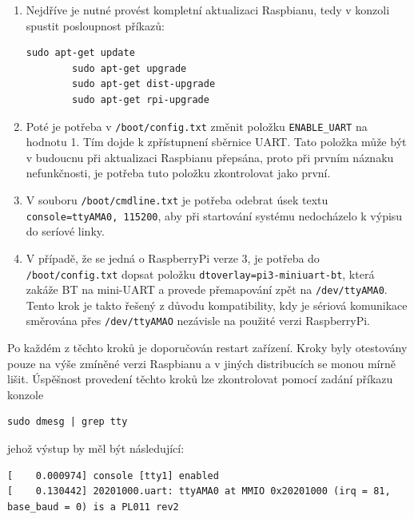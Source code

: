 \begin{enumerate}
	\item Nejdříve je nutné provést kompletní aktualizaci Raspbianu, tedy v konzoli spustit posloupnost příkazů:
	
	\begin{lstlisting}[style=MyCodeBash]
		sudo apt-get update
		sudo apt-get upgrade
		sudo apt-get dist-upgrade
		sudo apt-get rpi-upgrade	
	\end{lstlisting}
					
	\item Poté je potřeba v \texttt{/boot/config.txt} změnit položku \texttt{ENABLE\_UART} na hodnotu 1. Tím dojde k zpřístupnení sběrnice UART. Tato položka může být v budoucnu při aktualizaci Raspbianu přepsána, proto při prvním náznaku nefunkčnosti, je potřeba tuto položku zkontrolovat jako první.
	\item V souboru \texttt{/boot/cmdline.txt} je potřeba odebrat úsek textu \texttt{console=ttyAMA0, 115200}, aby při startování systému nedocházelo k výpisu do seríové linky. 
	\item V případě, že se jedná o RaspberryPi verze 3, je potřeba do \texttt{/boot/config.txt} dopsat položku \texttt{dtoverlay=pi3-miniuart-bt}, která zakáže BT na mini-UART a provede přemapování zpět na \texttt{/dev/ttyAMA0}. Tento krok je takto řešený z důvodu kompatibility, kdy je sériová komunikace směrována přes \texttt{/dev/ttyAMAO} nezávisle na použité verzi RaspberryPi.
\end{enumerate}

Po každém z těchto kroků je doporučován restart zařízení. Kroky byly otestovány pouze na výše zmíněné verzi Raspbianu a v jiných distribucích se monou mírně lišit. Úspěšnost provedení těchto kroků lze zkontrolovat pomocí zadání příkazu konzole 
	\begin{lstlisting}[style=MyCodeBash]
			sudo dmesg | grep tty
	\end{lstlisting}

jehož výstup by měl být následující:
					
	\begin{lstlisting}[style=MyCodeBash]
[    0.000974] console [tty1] enabled
[    0.130442] 20201000.uart: ttyAMA0 at MMIO 0x20201000 (irq = 81, base_baud = 0) is a PL011 rev2
	\end{lstlisting}
	\vspace{-20pt}



